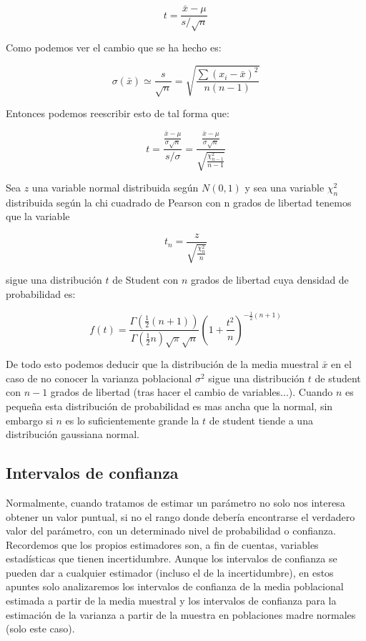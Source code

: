 \documentclass[12pt,a4paper]{book}
\newcommand{\parentesis}[1]{\left( #1 \right)}
\begin{document}
\begin{equation}
t = \dfrac{\bar{x}-\mu}{s/\sqrt{n}}
\end{equation}

Como podemos ver el cambio que se ha hecho es:

\begin{equation}
\sigma(\bar{x}) \simeq \dfrac{s}{\sqrt{n}} = \sqrt{\dfrac{\sum{(x_i-\bar{x})^2}}{n (n-1)}}
\end{equation}

Entonces podemos reescribir esto de tal forma que:

$$ t = \dfrac{\frac{\bar{x}-\mu}{\sigma \sqrt{n}}}{s/\sigma} = \dfrac{\frac{\bar{x}-\mu}{\sigma \sqrt{n}}}{\sqrt{\frac{\chi^2_{n-1}}{n-1}}} $$

Sea $z$ una variable normal distribuida según $N(0,1)$ y sea una variable $\chi^2_n$ distribuida según la chi cuadrado de Pearson con n grados de libertad tenemos que la variable

\begin{equation}
t_n = \dfrac{z}{\sqrt{\frac{\chi^2_n}{n}}}
\end{equation}

sigue una distribución $t$ de Student con $n$ grados de libertad cuya densidad de probabilidad es:

\begin{equation}
f(t) = \dfrac{\Gamma (\frac{1}{2}(n+1))}{\Gamma (\frac{1}{2}n) \sqrt{\pi} \sqrt{n}} \parentesis{1+\dfrac{t^2}{n}}^{-\frac{1}{2} (n+1)}
\end{equation}

De todo esto podemos deducir que la distribución de la media muestral $\bar{x}$ en el caso de no conocer la varianza poblacional $\sigma^2$ sigue una distribución $t$ de student con $n-1$ grados de libertad (tras hacer el cambio de variables...). Cuando $n$ es pequeña esta distribución de probabilidad es mas ancha que la normal, sin embargo si $n$ es lo suficientemente grande la $t$ de student tiende a una distribución gaussiana normal. 

\subsection{Intervalos de confianza}

Normalmente, cuando tratamos de estimar un parámetro no solo nos interesa obtener un valor puntual, si no el rango donde debería encontrarse el verdadero valor del parámetro, con un determinado nivel de probabilidad o confianza. Recordemos que los propios estimadores son, a fin de cuentas, variables estadísticas que tienen incertidumbre. Aunque los intervalos de confianza se pueden dar a cualquier estimador (incluso el de la incertidumbre), en estos apuntes solo analizaremos los intervalos de confianza de la media poblacional estimada a partir de la media muestral y los intervalos de confianza para la estimación de la varianza a partir de la muestra en poblaciones madre normales (solo este caso). 
\end{document}
